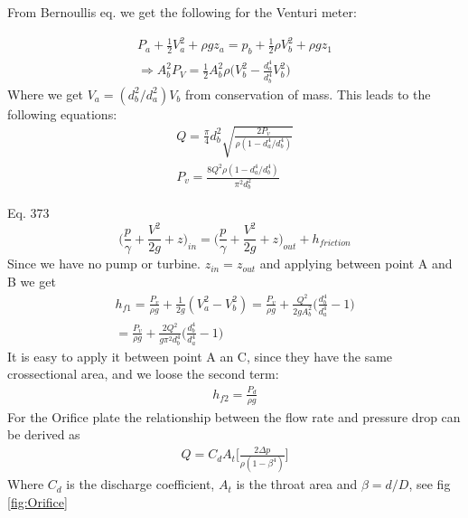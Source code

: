 From Bernoullis eq. we get the following for the Venturi meter:

\begin{eqnarray}
P_a +\frac{1}{2} V_a^2 + \rho g z_a = p_b + \frac{1}{2} \rho V_b ^2 + \rho g z_1 \\
\Rightarrow A_b^2 P_V = \frac{1}{2}A_b^2 \rho \big(V_b^2 - \tfrac{d_a^4}{d_b^4}V_b^2 \big) 
\end{eqnarray}
Where we get $V_a = (d_b^2/d_a^2)V_b$ from conservation of mass. This leads to the following equations:
\begin{eqnarray}
    Q = \frac{\pi}{4}d_b^2 \sqrt{\frac{2P_v}{\rho(1-d_a^4/d_b^4)}} \\
    P_v = \frac{8Q^2\rho(1-d_a^4/d_b^4)}{\pi^2d_b^2}
    \label{eq:Qventuri}
\end{eqnarray}

Eq. 373\cite{White_Xue_2021}
\begin{equation}
    \bigg(\frac{p}{\gamma} + \frac{V^2}{2g} + z\bigg)_{in} = \bigg(\frac{p}{\gamma} + \frac{V^2}{2g} + z\bigg)_{out} + h_{friction}
\end{equation}
Since we have no pump or turbine. $z_{in}=z_{out}$ and applying between point A and B we get
\begin{eqnarray}
    h_{f1} = \frac{P_v}{\rho g} + \frac{1}{2g}(V_a^2-V_b^2) = \frac{P_v}{\rho g} + \frac{Q^2}{2gA_b^2}\bigg(\frac{d_b^4}{d_a^4}-1\bigg) \\
    = \frac{P_v}{\rho g} + \frac{2Q^2}{g\pi^2d_b^4}\bigg(\frac{d_b^4}{d_a^4}-1\bigg)
    \label{eq:hf1}
\end{eqnarray}
It is easy to apply it between point A an C, since they have the same crossectional area, and we loose the second term:
\begin{eqnarray}
    h_{f2} = \frac{P_d}{\rho g}
    \label{eq:hf2}
\end{eqnarray}
For the Orifice plate the relationship between the flow rate and pressure drop can be derived as \cite{White_2021}
\begin{eqnarray}
    Q = C_d A_t \bigg[\frac{2\Delta p}{\rho(1-\beta^4)}\bigg]
    \label{eq:Cd}
\end{eqnarray}
Where $C_d$ is the discharge coefficient, $A_t$ is the throat area and $\beta = d/D$, see fig \ref{fig:Orifice}